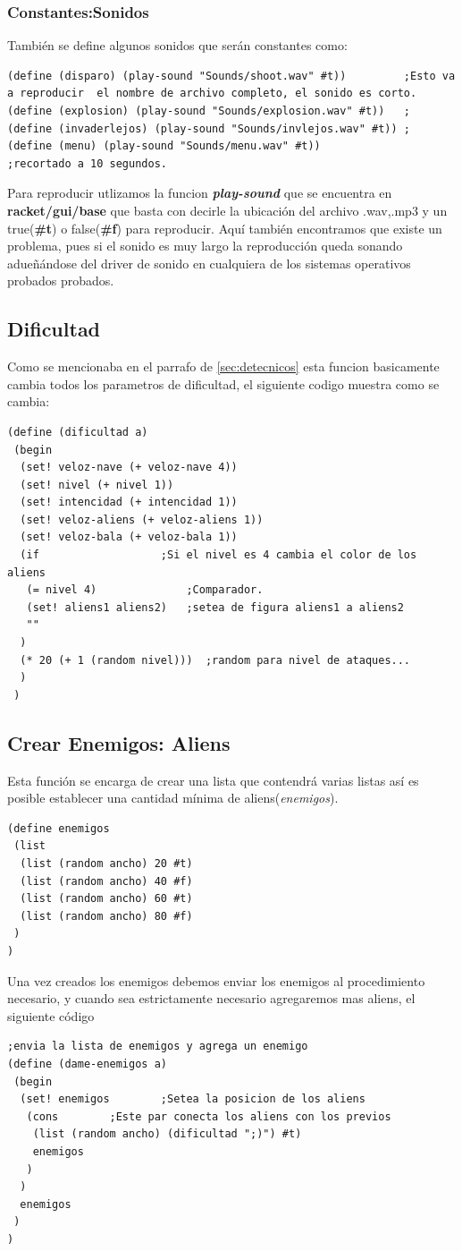 \documentclass[a4paper]{article} %
\begin{document}
\subsubsection{Constantes:Sonidos}

También se define algunos sonidos que serán constantes como:
\begin{lstlisting}
(define (disparo) (play-sound "Sounds/shoot.wav" #t))         ;Esto va a reproducir  el nombre de archivo completo, el sonido es corto.
(define (explosion) (play-sound "Sounds/explosion.wav" #t))   ;
(define (invaderlejos) (play-sound "Sounds/invlejos.wav" #t)) ;
(define (menu) (play-sound "Sounds/menu.wav" #t))             ;recortado a 10 segundos.
\end{lstlisting}
Para reproducir utlizamos la funcion \textbf{\emph{play-sound}} que se encuentra en \textbf{racket/gui/base} que basta con decirle la ubicación del archivo .wav,.mp3 y un true(\textbf{\#t}) o false(\textbf{\#f}) para reproducir. Aquí también encontramos que existe un problema, pues si el sonido es muy largo la reproducción queda sonando adueñándose del driver de sonido en cualquiera de los sistemas operativos probados probados.
\subsection{Dificultad}
Como se mencionaba en el parrafo de \ref{sec:detecnicos} esta funcion basicamente cambia todos los parametros de dificultad, el siguiente codigo muestra como se cambia:
\begin{lstlisting}
(define (dificultad a)
 (begin 
  (set! veloz-nave (+ veloz-nave 4))
  (set! nivel (+ nivel 1))
  (set! intencidad (+ intencidad 1))
  (set! veloz-aliens (+ veloz-aliens 1))
  (set! veloz-bala (+ veloz-bala 1))
  (if 		            ;Si el nivel es 4 cambia el color de los aliens 
   (= nivel 4)              ;Comparador.
   (set! aliens1 aliens2)   ;setea de figura aliens1 a aliens2
   ""
  )     
  (* 20 (+ 1 (random nivel)))  ;random para nivel de ataques...
  )
 ) 
\end{lstlisting}

\subsection{Crear Enemigos: Aliens}
Esta función se encarga de crear una lista que contendrá varias listas así es posible establecer una cantidad mínima de  aliens(\textit{enemigos}). 
\begin{lstlisting}
(define enemigos 
 (list 
  (list (random ancho) 20 #t) 
  (list (random ancho) 40 #f) 
  (list (random ancho) 60 #t)
  (list (random ancho) 80 #f)
 )
)
\end{lstlisting}
Una vez creados los enemigos debemos enviar los enemigos al procedimiento necesario, y cuando sea estrictamente necesario agregaremos mas aliens, el siguiente código 
\begin{lstlisting}
;envia la lista de enemigos y agrega un enemigo
(define (dame-enemigos a) 
 (begin
  (set! enemigos        ;Setea la posicion de los aliens
   (cons 		;Este par conecta los aliens con los previos
    (list (random ancho) (dificultad ";)") #t)
    enemigos
   )               
  )
  enemigos  
 )
)
\end{lstlisting}
\end{document}
